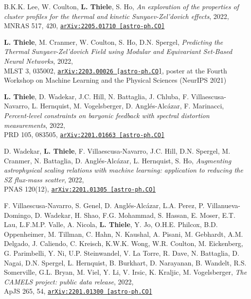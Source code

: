 B.K.K. Lee, W. Coulton, {\bf L. Thiele}, S. Ho,
\emph{An exploration of the properties of cluster profiles for the thermal
      and kinetic Sunyaev-Zel'dovich effects}, 2022,\\
MNRAS 517, 420,
\href{https://arxiv.org/abs/2205.01710}{\mbox{\texttt{arXiv:2205.01710 [astro-ph.CO]}}}

{\bf L. Thiele}, M. Cranmer, W. Coulton, S. Ho, D.N. Spergel,
\emph{Predicting the Thermal Sunyaev-Zel'dovich Field
      using Modular and Equivariant Set-Based Neural Networks}, 2022,\\
MLST 3, 035002,
\href{https://arxiv.org/abs/2203.00026}{\mbox{\texttt{arXiv:2203.00026 [astro-ph.CO]}}},
poster at the Fourth Workshop on Machine Learning and the Physical Sciences (NeurIPS 2021)

{\bf L. Thiele}, D. Wadekar, J.C. Hill, N. Battaglia, J. Chluba,
F. Villaescusa-Navarro, L. Hernquist, M. Vogelsberger, D. Angl\'es-Alc\'azar,
F. Marinacci,
\emph{Percent-level constraints on baryonic feedback with spectral distortion
      measurements}, 2022,\\
PRD 105, 083505,
\href{https://arxiv.org/abs/2201.01663}{\mbox{\texttt{arXiv:2201.01663 [astro-ph.CO]}}}

D. Wadekar, {\bf L. Thiele}, F. Villaescusa-Navarro, J.C. Hill, D.N. Spergel,
M. Cranmer, N. Battaglia, D. Angl\'es-Alc\'azar, L. Hernquist, S. Ho,
\emph{Augmenting astrophysical scaling relations with machine learning:
      application to reducing the SZ flux-mass scatter}, 2022,\\
PNAS 120(12),
\href{https://arxiv.org/abs/2201.01305}{\mbox{\texttt{arXiv:2201.01305 [astro-ph.CO]}}}

\newpage
\vspace*{0.5cm}

F. Villaescusa-Navarro, S. Genel, D. Angl\'es-Alc\'azar,
L.A. Perez, P. Villanueva-Domingo, D. Wadekar, H. Shao,
F.G. Mohammad, S. Hassan, E. Moser, E.T. Lau, L.F.M.P. Valle, A. Nicola,
{\bf L. Thiele}, Y. Jo, O.H.E. Philcox, B.D. Oppenheimer, M. Tillman, C. Hahn,
N. Kaushal, A. Pisani, M. Gebhardt, A.M. Delgado, J. Caliendo,
C. Kreisch, K.W.K. Wong, W.R. Coulton, M. Eickenberg,
G. Parimbelli, Y. Ni, U.P. Steinwandel, V. La Torre,
R. Dave, N. Battaglia, D. Nagai, D.N. Spergel, L. Hernquist, B. Burkhart,
D. Narayanan, B. Wandelt, R.S. Somerville, G.L. Bryan, M. Viel, Y. Li, V. Irsic,
K. Kraljic, M. Vogelsberger,
\emph{The CAMELS project: public data release}, 2022,\\
ApJS 265, 54,
\href{https://arxiv.org/abs/2201.01300}{\mbox{\texttt{arXiv:2201.01300 [astro-ph.CO]}}}


